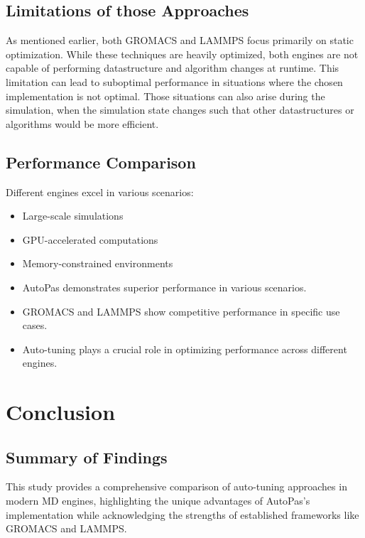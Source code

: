\documentclass[conference]{IEEEtran}
\begin{document}
\subsection*{Limitations of those Approaches}

As mentioned earlier, both GROMACS and LAMMPS focus primarily on static optimization. While these techniques are heavily optimized, both engines are not capable of performing datastructure and algorithm changes at runtime. This limitation can lead to suboptimal performance in situations where the chosen implementation is not optimal. Those situations can also arise during the simulation, when the simulation state changes such that other datastructures or algorithms would be more efficient.




\subsection{Performance Comparison}


Different engines excel in various scenarios:
\begin{itemize}
    \item Large-scale simulations
    \item GPU-accelerated computations
    \item Memory-constrained environments
\end{itemize}



\begin{itemize}
    \item AutoPas demonstrates superior performance in various scenarios.
    \item GROMACS and LAMMPS show competitive performance in specific use cases.
    \item Auto-tuning plays a crucial role in optimizing performance across different engines.
\end{itemize}



\section{Conclusion}

\subsection{Summary of Findings}

This study provides a comprehensive comparison of auto-tuning approaches in modern MD engines, highlighting the unique advantages of AutoPas's implementation while acknowledging the strengths of established frameworks like GROMACS and LAMMPS.
\end{document}
